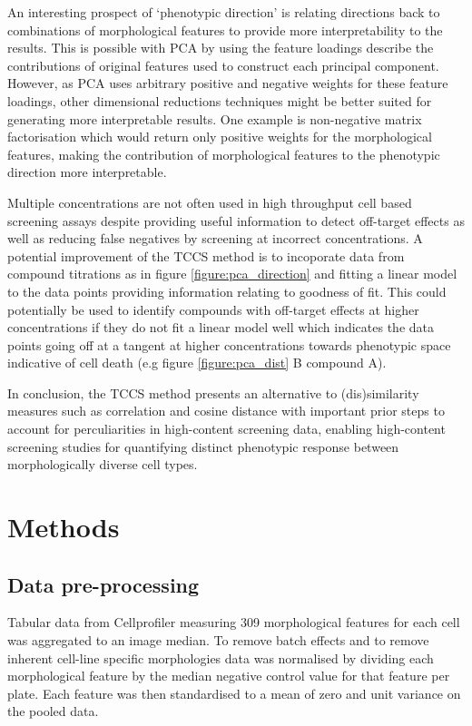 \documentclass[a4paper,11pt,twoside,openright]{scrbook}
\begin{document}
An interesting prospect of `phenotypic direction' is relating directions back to combinations of morphological features to provide more interpretability to the results.
This is possible with PCA by using the feature loadings describe the contributions of original features used to construct each principal component.
However, as PCA uses arbitrary positive and negative weights for these feature loadings, other dimensional reductions techniques might be better suited for generating more interpretable results.
One example is non-negative matrix factorisation which would return only positive weights for the morphological features, making the contribution of morphological features to the phenotypic direction more interpretable.


Multiple concentrations are not often used in high throughput cell based screening assays despite providing useful information to detect off-target effects as well as reducing false negatives by screening at incorrect concentrations.
A potential improvement of the TCCS method is to incoporate data from compound titrations as in figure \ref{figure:pca_direction} and fitting a linear model to the data points providing information relating to goodness of fit.
This could potentially be used to identify compounds with off-target effects at higher concentrations if they do not fit a linear model well which indicates the data points going off at a tangent at higher concentrations towards phenotypic space indicative of cell death (e.g figure \ref{figure:pca_dist} B compound A).

In conclusion, the TCCS method presents an alternative to (dis)similarity measures such as correlation and cosine distance with important prior steps to account for perculiarities in high-content screening data, enabling high-content screening studies for quantifying distinct phenotypic response between morphologically diverse cell types.


\section{Methods}

\subsection{Data pre-processing}
Tabular data from Cellprofiler measuring 309 morphological features for each cell was aggregated to an image median.
To remove batch effects and to remove inherent cell-line specific morphologies data was normalised by dividing each morphological feature by the median negative control value for that feature per plate.
Each feature was then standardised to a mean of zero and unit variance on the pooled data.
\end{document}
